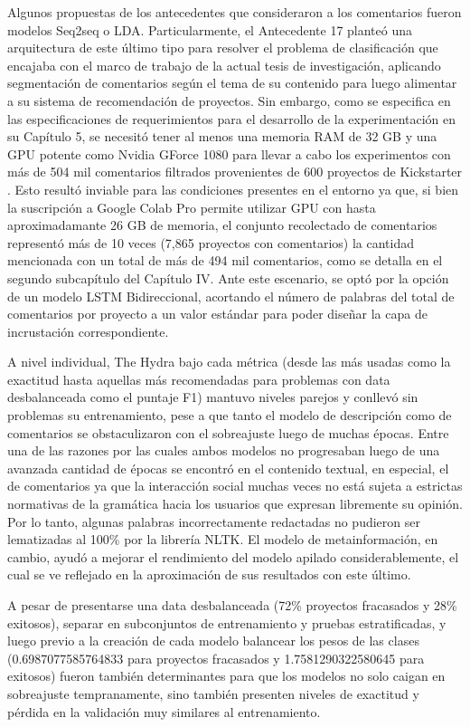 Algunos propuestas de los antecedentes que consideraron a los comentarios fueron modelos Seq2seq o LDA. Particularmente, el Antecedente 17 planteó una arquitectura de este último tipo para resolver el problema de clasificación que encajaba con el marco de trabajo de la actual tesis de investigación, aplicando segmentación de comentarios según el tema de su contenido para luego alimentar a su sistema de recomendación de proyectos. Sin embargo, como se especifica en las especificaciones de requerimientos para el desarrollo de la experimentación en su Capítulo 5, se necesitó tener al menos una memoria RAM de 32 GB y una GPU potente como Nvidia GForce 1080 para llevar a cabo los experimentos con más de 504 mil comentarios filtrados provenientes de 600 proyectos de Kickstarter \parencite{pr_shafqat2019topicpredictions}. Esto resultó inviable para las condiciones presentes en el entorno ya que, si bien la suscripción a Google Colab Pro permite utilizar GPU con hasta aproximadamante 26 GB de memoria, el conjunto recolectado de comentarios representó más de 10 veces (7,865 proyectos con comentarios) la cantidad mencionada con un total de más de 494 mil comentarios, como se detalla en el segundo subcapítulo del Capítulo IV. Ante este escenario, se optó por la opción de un modelo LSTM Bidireccional, acortando el número de palabras del total de comentarios por proyecto a un valor estándar para poder diseñar la capa de incrustación correspondiente.

A nivel individual, The Hydra bajo cada métrica (desde las más usadas como la exactitud hasta aquellas más recomendadas para problemas con data desbalanceada como el puntaje F1) mantuvo niveles parejos y conllevó sin problemas su entrenamiento, pese a que tanto el modelo de descripción como de comentarios se obstaculizaron con el sobreajuste luego de muchas épocas. Entre una de las razones por las cuales ambos modelos no progresaban luego de una avanzada cantidad de épocas se encontró en el contenido textual, en especial, el de comentarios ya que la interacción social muchas veces no está sujeta a estrictas normativas de la gramática hacia los usuarios que expresan libremente su opinión. Por lo tanto, algunas palabras incorrectamente redactadas no pudieron ser lematizadas al 100\% por la librería NLTK. El modelo de metainformación, en cambio, ayudó a mejorar el rendimiento del modelo apilado considerablemente, el cual se ve reflejado en la aproximación de sus resultados con este último.

A pesar de presentarse una data desbalanceada (72\% proyectos fracasados y 28\% exitosos), separar en subconjuntos de entrenamiento y pruebas estratificadas, y luego previo a la creación de cada modelo balancear los pesos de las clases (0.6987077585764833 para proyectos fracasados y 1.7581290322580645 para exitosos) fueron también determinantes para que los modelos no solo caigan en sobreajuste tempranamente, sino también presenten niveles de exactitud y pérdida en la validación muy similares al entrenamiento.


